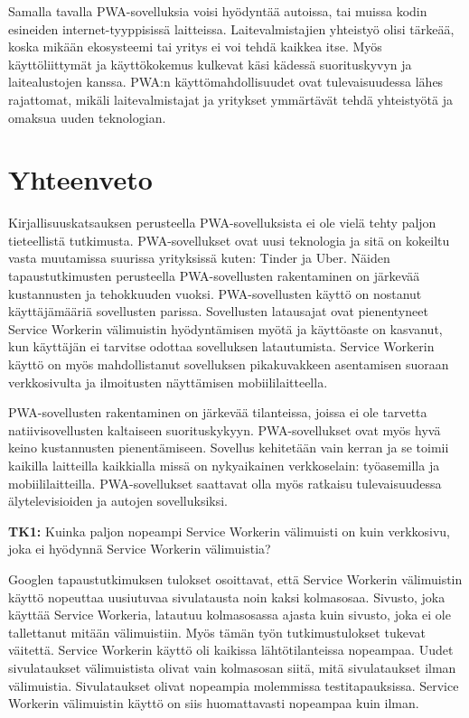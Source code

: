 \documentclass{tktltiki}
\begin{document}
Samalla tavalla PWA-sovelluksia voisi hyödyntää autoissa, tai muissa kodin esineiden internet-tyyppisissä laitteissa. Laitevalmistajien yhteistyö olisi tärkeää, koska mikään ekosysteemi tai yritys ei voi tehdä kaikkea itse. Myös käyttöliittymät ja käyttökokemus kulkevat käsi kädessä suorituskyvyn ja laitealustojen kanssa. PWA:n käyttömahdollisuudet ovat tulevaisuudessa lähes rajattomat, mikäli laitevalmistajat ja yritykset ymmärtävät tehdä yhteistyötä ja omaksua uuden teknologian. 

\newpage
\section{Yhteenveto}

Kirjallisuuskatsauksen perusteella PWA-sovelluksista ei ole vielä tehty paljon tieteellistä tutkimusta. PWA-sovellukset ovat uusi teknologia ja sitä on kokeiltu vasta muutamissa suurissa yrityksissä kuten: Tinder ja Uber. Näiden tapaustutkimusten perusteella PWA-sovellusten rakentaminen on järkevää kustannusten ja tehokkuuden vuoksi. PWA-sovellusten käyttö on nostanut käyttäjämääriä sovellusten parissa. Sovellusten latausajat ovat pienentyneet Service Workerin välimuistin hyödyntämisen myötä ja käyttöaste on kasvanut, kun käyttäjän ei tarvitse odottaa sovelluksen latautumista. Service Workerin käyttö on myös mahdollistanut sovelluksen pikakuvakkeen asentamisen suoraan verkkosivulta ja ilmoitusten näyttämisen mobiililaitteella. 

PWA-sovellusten rakentaminen on järkevää tilanteissa, joissa ei ole tarvetta natiivisovellusten kaltaiseen suorituskykyyn. PWA-sovellukset ovat myös hyvä keino kustannusten pienentämiseen. Sovellus kehitetään vain kerran ja se toimii kaikilla laitteilla kaikkialla missä on nykyaikainen verkkoselain: työasemilla ja mobiililaitteilla. PWA-sovellukset saattavat olla myös ratkaisu tulevaisuudessa älytelevisioiden ja autojen sovelluksiksi.

\textbf{TK1:} Kuinka paljon nopeampi Service Workerin välimuisti on kuin verkkosivu, joka ei hyödynnä Service Workerin välimuistia?

Googlen tapaustutkimuksen tulokset osoittavat, että Service Workerin välimuistin käyttö nopeuttaa uusiutuvaa sivulatausta noin kaksi kolmasosaa. Sivusto, joka käyttää Service Workeria, latautuu kolmasosassa ajasta kuin sivusto, joka ei ole tallettanut mitään välimuistiin. Myös tämän työn tutkimustulokset tukevat väitettä. Service Workerin käyttö oli kaikissa lähtötilanteissa nopeampaa. Uudet sivulataukset välimuistista olivat vain kolmasosan siitä, mitä sivulataukset ilman välimuistia. Sivulataukset olivat nopeampia molemmissa testitapauksissa. Service Workerin välimuistin käyttö on siis huomattavasti nopeampaa kuin ilman.
\end{document}
